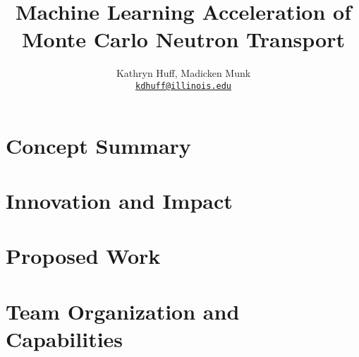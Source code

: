 \documentclass[letterpaper]{article}
\author{Kathryn Huff, Madicken Munk
        \\ \href{mailto:kdhuff@illinois.edu}{\texttt{kdhuff@illinois.edu}}
}
\date{}
\title{Machine Learning Acceleration of Monte Carlo Neutron Transport}
\begin{document}
\maketitle

\section{Concept Summary}
\section{Innovation and Impact}
\section{Proposed Work}
\section{Team Organization and Capabilities}
\nocite{*}
\pagebreak


\end{document}
